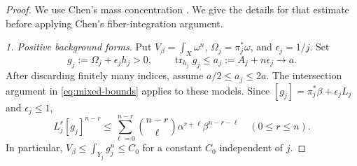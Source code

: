 \documentclass[reqno]{amsart}
\numberwithin{equation}{section}
\theoremstyle{definition}
\DeclareMathOperator{\tr}{tr}
\begin{document}
\begin{proof}
We use Chen's mass concentration
\cite[Theorem~1.18 and its proof in Section~3]{C21}.
 We give the details for that estimate before applying
Chen's fiber-integration argument.

\smallskip\noindent
\emph{1. Positive background forms.}
Put $V_\beta=\int_X\omega^n$, $\Omega_j=\pi_j^*\omega$, and
$\epsilon_j=1/j$. Set
\begin{equation}\label{eq:backgrounds}
 g_j:=\Omega_j+\epsilon_jh_j>0,\qquad
 \tr_{h_j}g_j\le a_j:=A_j+n\epsilon_j\longrightarrow a.
\end{equation}
After discarding finitely many indices, assume $a/2\le a_j\le2a$.
The intersection argument in
\eqref{eq:mixed-bounds} applies to these models.
Since $[g_j]=\pi_j^*\beta+\epsilon_jL_j$ and $\epsilon_j\le1$,
\begin{equation}\label{eq:positive-mixed}
 L_j^r[g_j]^{n-r}
 \le\sum_{\ell=0}^{n-r}\binom{n-r}{\ell}
                 \alpha^{r+\ell}\beta^{n-r-\ell}
 \quad(0\le r\le n).
\end{equation}
In particular, $V_\beta\le\int_{Y_j}g_j^n\le C_0$ for a constant
$C_0$ independent of $j$.


\end{proof}
\end{document}
